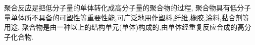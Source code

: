 \documentclass{ctexart}
\begin{document}
\pagestyle{plain}
\indent 聚合反应是把低分子量的单体转化成高分子量的聚合物的过程,%
聚合物具有低分子量单体所不具备的可塑性等重要性能,可广泛地用作塑料,纤维,橡胶,涂料,黏合剂等用途.%
聚合物是由一种以上的结构单元(单体)构成的,由单体经重复反应合成的高分子化合物.
\end{document}
